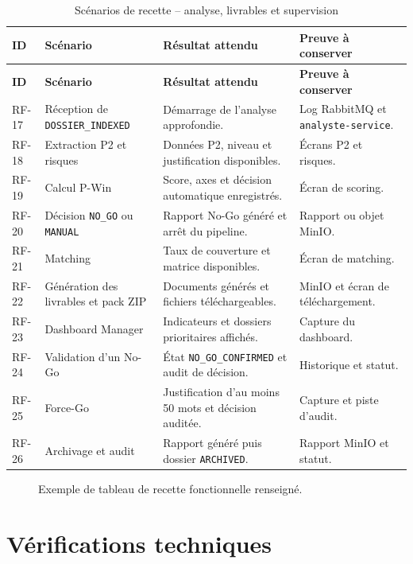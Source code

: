 \begin{longtable}{p{1.5cm}p{4.2cm}p{5.3cm}p{3cm}}
\caption{Scénarios de recette -- analyse, livrables et supervision}
\label{tab:recette-analyse} \\
\toprule
\textbf{ID} & \textbf{Scénario} & \textbf{Résultat attendu} & \textbf{Preuve à conserver} \\
\midrule
\endfirsthead
\toprule
\textbf{ID} & \textbf{Scénario} & \textbf{Résultat attendu} & \textbf{Preuve à conserver} \\
\midrule
\endhead
RF-17 & Réception de \texttt{DOSSIER\_INDEXED} & Démarrage de l'analyse approfondie. & Log RabbitMQ et \texttt{analyste-service}. \\
RF-18 & Extraction P2 et risques & Données P2, niveau et justification disponibles. & Écrans P2 et risques. \\
RF-19 & Calcul P-Win & Score, axes et décision automatique enregistrés. & Écran de scoring. \\
RF-20 & Décision \texttt{NO\_GO} ou \texttt{MANUAL} & Rapport No-Go généré et arrêt du pipeline. & Rapport ou objet MinIO. \\
RF-21 & Matching & Taux de couverture et matrice disponibles. & Écran de matching. \\
RF-22 & Génération des livrables et pack ZIP & Documents générés et fichiers téléchargeables. & MinIO et écran de téléchargement. \\
RF-23 & Dashboard Manager & Indicateurs et dossiers prioritaires affichés. & Capture du dashboard. \\
RF-24 & Validation d'un No-Go & État \texttt{NO\_GO\_CONFIRMED} et audit de décision. & Historique et statut. \\
RF-25 & Force-Go & Justification d'au moins 50 mots et décision auditée. & Capture et piste d'audit. \\
RF-26 & Archivage et audit & Rapport généré puis dossier \texttt{ARCHIVED}. & Rapport MinIO et statut. \\
\bottomrule
\end{longtable}

\begin{figure}[H]
\centering
\vspace{5cm}
\caption{Exemple de tableau de recette fonctionnelle renseigné.}
\label{fig:recette}
\end{figure}

\section{Vérifications techniques}

